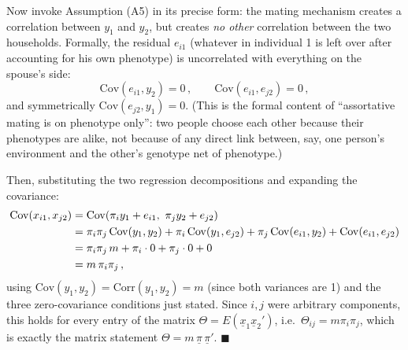 \documentclass[12pt]{article}
\begin{document}
Now invoke Assumption (A5) in its precise form: the mating mechanism creates a correlation between $y_1$ and $y_2$, but creates \emph{no other} correlation between the two households. Formally, the residual $e_{i1}$ (whatever in individual 1 is left over after accounting for his own phenotype) is uncorrelated with everything on the spouse's side:
\begin{equation}
\mathrm{Cov}(e_{i1},y_2)=0 \, , \qquad \mathrm{Cov}(e_{i1},e_{j2})=0 \, ,
\end{equation}
and symmetrically $\mathrm{Cov}(e_{j2},y_1)=0$. (This is the formal content of ``assortative mating is on phenotype only'': two people choose each other because their phenotypes are alike, not because of any direct link between, say, one person's environment and the other's genotype net of phenotype.)

Then, substituting the two regression decompositions and expanding the covariance:
\begin{align}
\mathrm{Cov}(x_{i1},x_{j2}) &= \mathrm{Cov}(\pi_i y_1 + e_{i1},\ \pi_j y_2 + e_{j2}) \notag \\
&= \pi_i\pi_j\,\mathrm{Cov}(y_1,y_2) + \pi_i\,\mathrm{Cov}(y_1,e_{j2}) + \pi_j\,\mathrm{Cov}(e_{i1},y_2) + \mathrm{Cov}(e_{i1},e_{j2}) \notag \\
&= \pi_i\pi_j\,m + \pi_i\cdot 0 + \pi_j\cdot 0 + 0 \notag \\
&= m\,\pi_i\pi_j \, ,
\end{align}
using $\mathrm{Cov}(y_1,y_2)=\mathrm{Corr}(y_1,y_2)=m$ (since both variances are 1) and the three zero-covariance conditions just stated. Since $i,j$ were arbitrary components, this holds for every entry of the matrix $\Theta=E(\underline x_1\underline x_2')$, i.e.\ $\Theta_{ij}=m\pi_i\pi_j$, which is exactly the matrix statement $\Theta=m\,\underline\pi\,\underline\pi'$. $\blacksquare$
\end{document}
